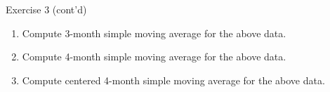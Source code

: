 \documentclass[
  ignorenonframetext,
  aspectratio=43,
]{beamer}
\let\olditem\item
\renewcommand\item{\olditem\justifying}
\begin{document}
\begin{frame}{Exercise 3 (cont'd)}
\protect\hypertarget{exercise-3-contd}{}
\pause

\begin{enumerate}
\item
  Compute 3-month simple moving average for the above data.
\item
  Compute 4-month simple moving average for the above data.
\item
  Compute centered 4-month simple moving average for the above data.
\end{enumerate}
\end{frame}
\end{document}
